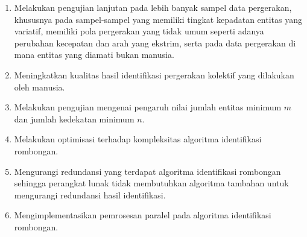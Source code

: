 \begin{enumerate}
    \item Melakukan pengujian lanjutan pada lebih banyak sampel data pergerakan, khususnya pada sampel-sampel yang memiliki tingkat kepadatan entitas yang variatif, memiliki pola pergerakan yang tidak umum seperti adanya perubahan kecepatan dan arah yang ekstrim, serta pada data pergerakan di mana entitas yang diamati bukan manusia.
    \item Meningkatkan kualitas hasil identifikasi pergerakan kolektif yang dilakukan oleh manusia.
    \item Melakukan pengujian mengenai pengaruh nilai jumlah entitas minimum $m$ dan jumlah kedekatan minimum $n$.
    \item Melakukan optimisasi terhadap kompleksitas algoritma identifikasi rombongan.
    \item Mengurangi redundansi yang terdapat algoritma identifikasi rombongan sehingga perangkat lunak tidak membutuhkan algoritma tambahan untuk mengurangi redundansi hasil identifikasi.
    \item Mengimplementasikan pemrosesan paralel pada algoritma identifikasi rombongan.
\end{enumerate}
